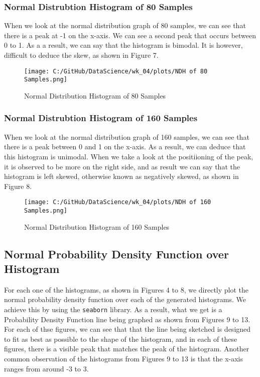 \documentclass[a4paper,twocolumn]{article}
\begin{document}
\subsubsection{Normal Distrubtion Histogram of 80 Samples}
When we look at the normal distribution graph of 80 samples, we can see that there is a peak at -1 on the x-axis.
We can see a second peak that occurs between 0 to 1. As a a result, we can say that the histogram is bimodal. It is 
however, difficult to deduce the skew, as shown in Figure 7. 

\begin{figure}[htbp] 
    \centering
    \noindent
    \texttt{[image: C:/GitHub/DataScience/wk\_04/plots/NDH of 80 Samples.png]}
    \caption{Normal Distribution Histogram of 80 Samples} 
\end{figure}

\newpage

\subsubsection{Normal Distrubtion Histogram of 160 Samples}
When we look at the normal distribution graph of 160 samples, we can see that there is a peak between 0 and 1 on the 
x-axis. As a result, we can deduce that this histogram is unimodal. When we take a look at the positiioning of the
peak, it is observed to be more on the right side, and as result we can say that the histogram is left skewed, 
otherwise known as negatively skewed, as shown in Figure 8.

\begin{figure}[htbp] 
    \centering
    \noindent
    \texttt{[image: C:/GitHub/DataScience/wk\_04/plots/NDH of 160 Samples.png]}
    \caption{Normal Distribution Histogram of 160 Samples} 
\end{figure}

\subsection{Normal Probability Density Function over Histogram}
For each one of the histograms, as shown in Figures 4 to 8, we directly plot the normal probability density function 
over each of the generated histograms. We achieve this by using the \texttt{seaborn} library. As a result, what we
get is a Probability Density Function line being graphed as shown from Figures 9 to 13. \\

For each of thse figures, we can see that that the line being sketched is designed to fit as best as possible to the
shape of the histogram, and in each of these figures, there is a visible peak that matches the peak of the histogram.
Another common observation of the histograms from Figures 9 to 13 is that the x-axis ranges from around -3 to 3. \\
\end{document}
